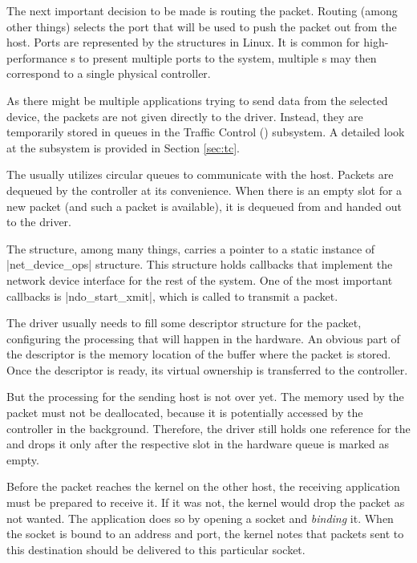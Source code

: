 The next important decision to be made is routing the packet. Routing (among
other things) selects the port that will be used to push the packet out from
the host. Ports are represented by the \netdev{} structures in Linux. It is common
for high-performance s to present multiple ports to the system,
multiple \netdev s may then correspond to a single physical controller.

As there might be multiple applications trying to send data from the
selected device, the packets are not given directly to the driver. Instead,
they are temporarily stored in queues in the Traffic Control () subsystem. A detailed
look at the subsystem is provided in Section \ref{sec:tc}.

The  usually utilizes circular queues to communicate with the host.
Packets are dequeued by the controller at its convenience. When there is an
empty slot for a new packet (and such a packet is available), it is dequeued
from  and handed out to the driver.

The \netdev{} structure, among many things, carries a pointer to
a static instance of \struct|net_device_ops| structure. This structure holds callbacks that
implement the network device interface for the rest of the system. One of the
most important callbacks is \fnc|ndo_start_xmit|, which is called to transmit a packet.

The driver usually needs to fill some descriptor structure for the packet,
configuring the processing that will happen in the hardware. An obvious part
of the descriptor is the memory location of the buffer where the packet is
stored. Once the descriptor is ready, its virtual ownership is transferred to
the controller.

But the processing for the sending host is not over yet. The memory used by
the packet must not be deallocated, because it is potentially accessed by the
controller in the background. Therefore, the driver still holds one reference
for the \skb{} and drops it only after the respective slot in the hardware
queue is marked as empty.

Before the packet reaches the kernel on the other host, the receiving application must be
prepared to receive it. If it was not, the kernel would drop the packet as
not wanted. The application does so by opening a socket and \emph{binding} it.
When the socket is bound to an address and port, the kernel notes that packets
sent to this destination should be delivered to this particular socket.

